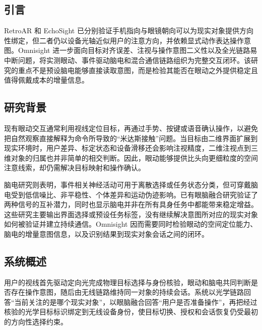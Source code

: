 \subsection{引言}
RetroAR 和 EchoSight 已分别验证手机指向与眼镜朝向可以为现实对象提供方向性绑定，但二者仍以设备光轴近似用户的注意方向，并依赖显式动作表达操作意图。Omnisight 进一步面向目标对齐误差、注视与操作意图二义性以及全光链路易中断问题，将实测眼动、事件驱动脑电和混合通信链路组织为完整交互闭环。该研究的重点不是预设脑电能够直接读取意图，而是检验其能否在眼动之外提供稳定且值得佩戴成本的增量信息。


\subsection{研究背景}
现有眼动交互通常利用视线定位目标，再通过手势、按键或语音确认操作，以避免把自然观察直接解释为命令所导致的“米达斯接触”问题\supercite{jacobgaze,gaze_pinch}。当目标由二维界面扩展到现实环境时，用户差异、标定状态和设备滑移还会影响注视精度，二维注视点到三维对象的归属也并非简单的相交判断\supercite{everydaygaze,gaze_to_object_mapping}。因此，眼动能够提供比头向更细粒度的空间注意线索，却仍需解决目标映射和操作确认。

脑电研究则表明，事件相关神经活动可用于离散选择或任务状态分类，但可穿戴脑电受到低信噪比、非平稳性、个体差异和运动伪迹影响\supercite{eegbcisurvey}。已有眼脑融合研究验证了两种信号的互补潜力，同时也显示脑电并非在所有具身任务中都能带来稳定增益\supercite{wang_eeg_eye_2021,khanna_handover_2025}。这些研究主要输出界面选择或预设任务标签，没有继续解决意图所对应的现实对象如何被验证并建立持续通信。Omnisight 因而需要同时检验眼动的空间定位能力、脑电的增量意图信息，以及识别结果到现实对象会话之间的闭环。

\subsection{系统概述}
用户的视线首先驱动定向光完成物理目标选择与身份核验，眼动和脑电共同判断是否存在操作意图，随后由无线链路维持同一对象的持续会话。系统以光学链路回答“当前关注的是哪个现实对象”，以眼脑融合回答“用户是否准备操作”，再把经过核验的光学目标标识绑定到无线设备身份，使目标切换、授权和会话恢复仍受最初的方向性选择约束。

